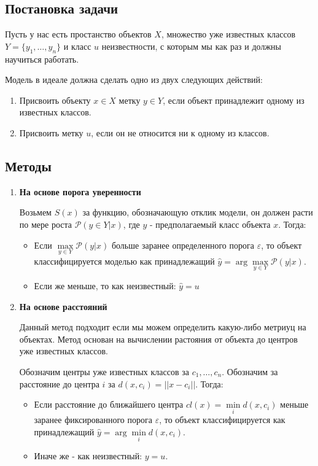 \subsection{Постановка задачи}
Пусть у нас есть простанство объектов $X$, множество уже известных классов $Y = \{y_1, \dots, y_n\}$ и класс $u$ неизвестности, с которым мы как раз и должны научиться работать.

Модель в идеале должна сделать одно из двух следующих действий:
\begin{enumerate}
    \item Присвоить объекту $x \in X$ метку $y \in Y$, если объект принадлежит одному из известных классов.
    \item Присвоить метку $u$, если он не относится ни к одному из классов.
\end{enumerate}

\subsection{Методы}
\begin{enumerate}
    \item \textbf{На основе порога уверенности}

          Возьмем $S(x)$ за функцию, обозначающую отклик модели, он должен расти по мере роста $\mathcal{P}(y \in Y | x)$, где $y$ - предполагаемый класс объекта $x$.
          Тогда:
          \begin{itemize}
              \item Если $\max\limits_{y \in Y}{\mathcal{P}(y|x)}$ больше заранее определенного порога $\varepsilon$, то объект классифицируется моделью как принадлежащий $\hat{y} = \arg\max\limits_{y \in Y}{\mathcal{P}(y|x)}$.
              \item Если же меньше, то как неизвестный: $\hat{y} = u$
          \end{itemize}

    \item \textbf{На основе расстояний}

          Данный метод подходит если мы можем определить какую-либо метриуц на объектах.
          Метод основан на вычислении растояния от объекта до центров уже известных классов.

          Обозначим центры уже известных классов за $c_1, \dots, c_n$.
          Обозначим за расстояние до центра $i$ за $d(x, c_i) = || x - c_i ||$.
          Тогда:
          \begin{itemize}
              \item Если расстояние до ближайшего центра $cl(x) = \min\limits_{i}d(x, c_i)$ меньше заранее фиксированного порога $\varepsilon$, то объект классифицируется как принадлежащий $\hat{y} = \arg\min\limits_{i}d(x, c_i)$.
              \item Иначе же - как неизвестный: $y = u$.
          \end{itemize}
\end{enumerate}

